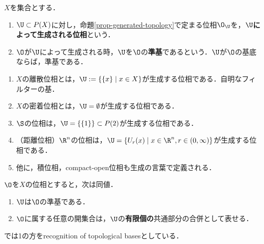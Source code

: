 \documentclass[uplatex,dvipdfmx]{jsreport}
\begin{document}
\begin{definition}\label{def-subbasis}
    $X$を集合とする．
    \begin{enumerate}
        \item $\U\subset P(X)$に対し，命題\ref{prop-generated-topology}で定まる位相$\O_\U$を，\textbf{$\U$によって生成される位相}という．
        \item $\O$が$\U$によって生成される時，$\U$を$\O$の\textbf{準基}であるという．$\U$が$\O$の基底ならば，準基である．
    \end{enumerate}
\end{definition}

\begin{example}[生成される位相として定義される位相の例]\mbox{}
    \begin{enumerate}
        \item $X$の離散位相とは，$\U:=\{\{x\}\mid x\in X\}$が生成する位相である．自明なフィルターの基．
        \item $X$の密着位相とは，$\U=\emptyset$が生成する位相である．
        \item $\S$の位相は，$\U=\{\{1\}\}\subset P(2)$が生成する位相である．
        \item （距離位相）$\R^n$の位相は，$\U=\{U_r(x)\mid x\in\R^n,r\in(0,\infty)\}$が生成する位相である．
        \item 他に，積位相，compact-open位相も生成の言葉で定義される．
    \end{enumerate}
\end{example}

\begin{proposition}
    $\O$を$X$の位相とすると，次は同値．
    \begin{enumerate}
        \item $\U$は$\O$の準基である．
        \item $\O$に属する任意の開集合は，$\U$の\textbf{有限個の}共通部分の合併として表せる．
    \end{enumerate}
    \cite{nLab}では1の方をrecognition of topological basesとしている．
\end{proposition}
\end{document}
